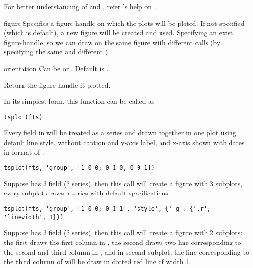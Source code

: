 \begin{argdesc}
\begin{argdesc}
                      For better understanding of  and , refer \matlab{}'s help on .
	 \item[figure]    Specifies a figure handle on which the plots will be ploted.
	                  If not specified (which is default), a new figure will be created and used.
					  Specifying an exist figure handle, so we can draw on the same figure with different  calls
					  (by specifying the same  and different ).
	 \item[orientation] Can be   or . Default is .
    \end{argdesc}
\end{argdesc}

\outarg
\hspace{0.5cm} Return the figure handle it plotted.


In its simplest form, this function can be called as
\begin{lstlisting}[numbers=none]
   tsplot(fts)
\end{lstlisting}
Every field in  will be treated as a series and drawn together in one plot using default line style, 
without caption and y-axis label, and x-axis shown with dates in format of .

\begin{lstlisting}[numbers=none]
   tsplot(fts, 'group', [1 0 0; 0 1 0, 0 0 1])
\end{lstlisting}
Suppose  has 3 field (3 series), 
then this call will create a figure with 3 subplots, every subplot draws a series with default specifications.

\begin{lstlisting}[numbers=none]
   tsplot(fts, 'group', [1 0 0; 0 1 1], 'style', {'-g', {'.r', 'linewidth', 1}})
\end{lstlisting}
Suppose  has 3 field (3 series),
then this call will create a figure with 2 subplots: the first draws the first column in ,
the second draws two line corresponding to the second and third column in , 
and in second subplot, the line corresponding to the third column of  will be draw in dotted red line of width 1.

